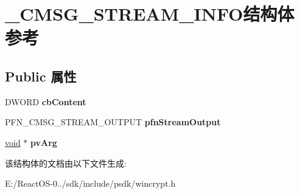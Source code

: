 \hypertarget{struct___c_m_s_g___s_t_r_e_a_m___i_n_f_o}{}\section{\+\_\+\+C\+M\+S\+G\+\_\+\+S\+T\+R\+E\+A\+M\+\_\+\+I\+N\+F\+O结构体 参考}
\label{struct___c_m_s_g___s_t_r_e_a_m___i_n_f_o}
\subsection*{Public 属性}
\begin{DoxyCompactItemize}
\item 
\mbox{\label{struct___c_m_s_g___s_t_r_e_a_m___i_n_f_o_aece4499c34761e31561729e591a15286}} 
D\+W\+O\+RD {\bfseries cb\+Content}
\item 
\mbox{\label{struct___c_m_s_g___s_t_r_e_a_m___i_n_f_o_a540d60b268e6411151820a7368f2c428}} 
P\+F\+N\+\_\+\+C\+M\+S\+G\+\_\+\+S\+T\+R\+E\+A\+M\+\_\+\+O\+U\+T\+P\+UT {\bfseries pfn\+Stream\+Output}
\item 
\mbox{\label{struct___c_m_s_g___s_t_r_e_a_m___i_n_f_o_ab2f5495b4ac9d23b42850085634b8b80}} 
\hyperlink{interfacevoid}{void} $\ast$ {\bfseries pv\+Arg}
\end{DoxyCompactItemize}


该结构体的文档由以下文件生成\+:\begin{DoxyCompactItemize}
\item 
E\+:/\+React\+O\+S-\/0../sdk/include/psdk/wincrypt.\+h\end{DoxyCompactItemize}
